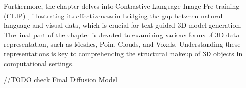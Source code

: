 Furthermore, the chapter delves into Contrastive Language-Image Pre-training (CLIP) \citep{radfordCLIP}, illustrating its effectiveness in bridging the gap between natural language and visual data, which is crucial for text-guided 3D model generation. The final part of the chapter is devoted to examining various forms of 3D data representation, such as Meshes, Point-Clouds, and Voxels. Understanding these representations is key to comprehending the structural makeup of 3D objects in computational settings.

//TODO check Final Diffusion Model







